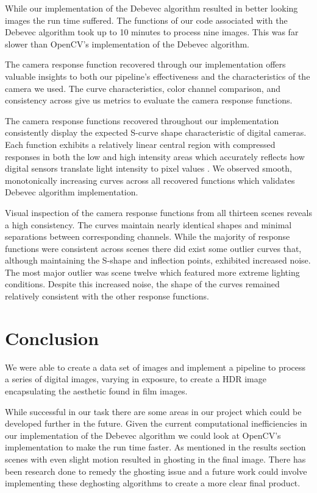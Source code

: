 \documentclass[
	a4paper, %
	10pt, %
	unnumberedsections, %
	twoside, %
]{LTJournalArticle}
\begin{document}
While our implementation of the Debevec algorithm resulted in better looking images the run time suffered. The functions of our code associated with the Debevec algorithm took up to 10 minutes to process nine images. This was far slower than OpenCV’s implementation of the Debevec algorithm.  

The camera response function recovered through our implementation offers valuable insights to both our pipeline’s effectiveness and the characteristics of the camera we used. The curve characteristics, color channel comparison, and consistency across give us metrics to evaluate the camera response functions. 

The camera response functions recovered throughout our implementation consistently display the expected S-curve shape characteristic of digital cameras. Each function exhibits a relatively linear central region with compressed responses in both the low and high intensity areas which accurately reflects how digital sensors translate light intensity to pixel values \autocite{quant_cite}. We observed smooth, monotonically increasing curves across all recovered functions which validates Debevec algorithm implementation. 

Visual inspection of the camera response functions from all thirteen scenes reveals a high consistency. The curves maintain nearly identical shapes and minimal separations between corresponding channels. While the majority of response functions were consistent across scenes there did exist some outlier curves that, although maintaining the S-shape and inflection points, exhibited increased noise. The most major outlier was scene twelve which featured more extreme lighting conditions. Despite this increased noise, the shape of the curves remained relatively consistent with the other response functions.



\section{Conclusion}

We were able to create a data set of images and implement a pipeline to process a series of digital images, varying in exposure, to create a HDR image encapsulating the aesthetic found in film images. 

While successful in our task there are some areas in our project which could be developed further in the future. Given the current computational inefficiencies in our implementation of the Debevec algorithm we could look at OpenCV’s implementation to make the run time faster. 
As mentioned in the results section scenes with even slight motion resulted in ghosting in the final image. There has been research done \autocite{conclusion_cite} to remedy the ghosting issue and a future work could involve implementing these deghosting algorithms to create a more clear final product.
\end{document}
